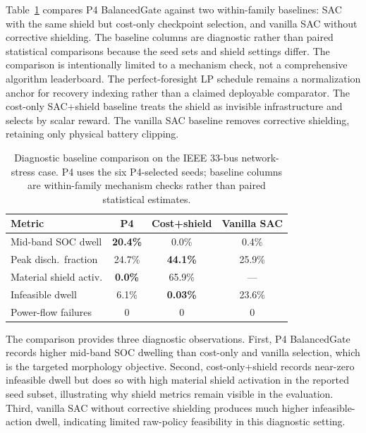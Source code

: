 Table~\ref{tab:external_baseline_comparison} compares P4 BalancedGate against two within-family baselines: SAC with the same shield but cost-only checkpoint selection, and vanilla SAC without corrective shielding. The baseline columns are diagnostic rather than paired statistical comparisons because the seed sets and shield settings differ. The comparison is intentionally limited to a mechanism check, not a comprehensive algorithm leaderboard. The perfect-foresight LP schedule remains a normalization anchor for recovery indexing rather than a claimed deployable comparator. The cost-only SAC+shield baseline treats the shield as invisible infrastructure and selects by scalar reward. The vanilla SAC baseline removes corrective shielding, retaining only physical battery clipping.

\begin{table}[!t]
\centering
\scriptsize
\setlength{\tabcolsep}{3.2pt}
\renewcommand{\arraystretch}{1.12}
\caption{Diagnostic baseline comparison on the IEEE 33-bus network-stress case. P4 uses the six P4-selected seeds; baseline columns are within-family mechanism checks rather than paired statistical estimates.}
\label{tab:external_baseline_comparison}
\begin{tabular}{lccc}
\toprule
Metric & P4 & Cost+shield & Vanilla SAC \\
\midrule
Mid-band SOC dwell & \textbf{20.4\%} & 0.0\% & 0.4\% \\
Peak disch.\ fraction & 24.7\% & \textbf{44.1\%} & 25.9\% \\
Material shield activ. & \textbf{0.0\%} & 65.9\% & --- \\
Infeasible dwell & 6.1\% & \textbf{0.03\%} & 23.6\% \\
Power-flow failures & 0 & 0 & 0 \\
\bottomrule
\end{tabular}
\end{table}

The comparison provides three diagnostic observations. First, P4 BalancedGate records higher mid-band SOC dwelling than cost-only and vanilla selection, which is the targeted morphology objective. Second, cost-only+shield records near-zero infeasible dwell but does so with high material shield activation in the reported seed subset, illustrating why shield metrics remain visible in the evaluation. Third, vanilla SAC without corrective shielding produces much higher infeasible-action dwell, indicating limited raw-policy feasibility in this diagnostic setting.

